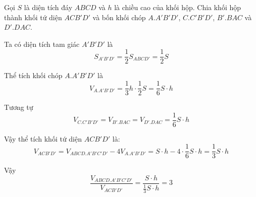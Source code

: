 \documentclass[12pt]{article}
\begin{document}
Gọi $S$ là diện tích đáy $ABCD$ và $h$ là chiều cao của khối hộp. Chia khối hộp thành khối tứ diện $ACB'D'$ và bốn khối chóp $A.A'B'D'$, $C.C'B'D'$, $B'.BAC$ và $D'.DAC$.

Ta có diện tích tam giác $A'B'D'$ là 
\[
S_{A'B'D'} = \frac{1}{2} S_{ABCD'} = \frac{1}{2}S
\]

Thể tích khối chóp $A.A'B'D'$ là
\[
V_{A.A'B'D'} = \frac{1}{3} h \cdot \frac{1}{2} S = \frac{1}{6} S \cdot h
\]

Tương tự
\[
V_{C.C'B'D'} = V_{B'.BAC} = V_{D'.DAC} = \frac{1}{6} S \cdot h
\]

Vậy thể tích khối tứ diện $ACB'D'$ là:
\[
V_{ACB'D'} = V_{ABCD.A'B'C'D'} - 4V_{A.A'B'D'} = S \cdot h - 4 \cdot \frac{1}{6} S \cdot h = \frac{1}{3} S \cdot h
\]

Vậy
\[
\frac{V_{ABCD.A'B'C'D'}}{V_{ACB'D'}} = \frac{S \cdot h}{\frac{1}{3} S \cdot h} = 3
\]
\end{document}
